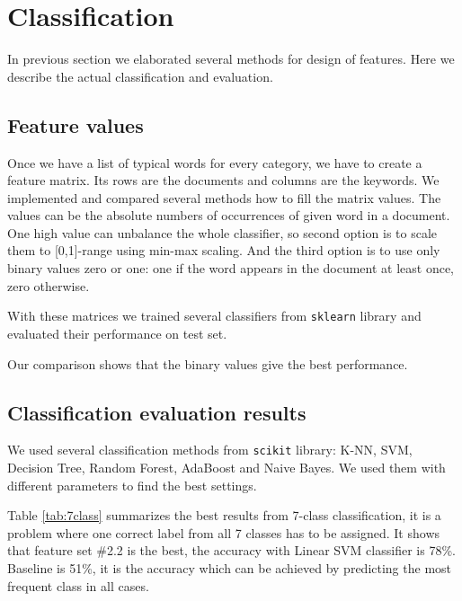 \documentclass[a4paper]{article}
\begin{document}
\section{Classification}

In previous section we elaborated several methods for design of features.
Here we describe the actual classification and evaluation.

\subsection{Feature values}

Once we have a list of typical words for every category, we have to create
a feature matrix. Its rows are the documents and columns are the keywords. 
We implemented and compared several methods how to fill the matrix values.
The values can be the absolute numbers of occurrences of given word in
a document. One high value can unbalance the whole classifier, so second
option is to scale them to [0,1]-range using min-max scaling. And the third option is
to use only binary values zero or one: one if the word appears in the
document at least once, zero otherwise.

With these matrices we trained several classifiers from \texttt{sklearn}
library and evaluated their performance on test set. 

Our comparison shows that the binary values give the best performance.

%





\subsection{Classification evaluation results}

We used several classification methods from \texttt{scikit} library: K-NN,
SVM, Decision Tree, Random Forest, AdaBoost and Naive Bayes. We used them
with different parameters to find the best settings.

Table \ref{tab:7class} summarizes the best results from 7-class
classification, it is a problem where one correct label from all 7 classes
has to be assigned. It shows that feature set \#2.2 is the best, the
accuracy with Linear SVM classifier is 78\%. Baseline is 51\%, it is the
accuracy which can be achieved by predicting the most frequent class in all
cases.
\end{document}
